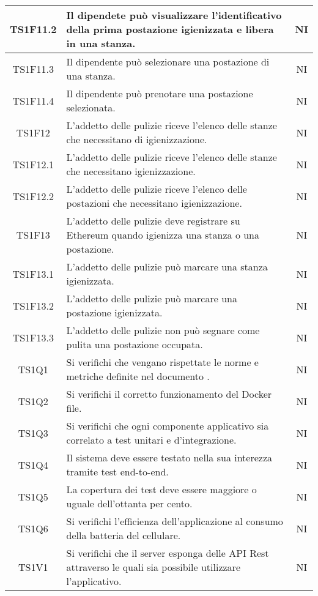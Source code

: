 \begin{center}
\begin{longtable}{|c|p{10cm}|c|}
			\hline
			TS1F11.2 & Il dipendete può visualizzare l'identificativo della prima postazione igienizzata e libera in una stanza. & NI \\	
			\hline
			TS1F11.3 & Il dipendente può selezionare una postazione di una stanza. & NI \\	
			\hline
			TS1F11.4 & Il dipendente può prenotare una postazione selezionata. & NI \\	
			\hline
			TS1F12 & L'addetto delle pulizie riceve l'elenco delle stanze che necessitano di igienizzazione. & NI \\	
			\hline
			TS1F12.1 & L'addetto delle pulizie riceve l'elenco delle stanze che necessitano igienizzazione. & NI \\	
			\hline
			TS1F12.2 & L'addetto delle pulizie riceve l'elenco delle postazioni che necessitano igienizzazione. & NI \\	
			\hline
			TS1F13 & L'addetto delle pulizie deve registrare su Ethereum quando igienizza una stanza o una postazione. & NI \\	
			\hline
			TS1F13.1 & L'addetto delle pulizie può marcare una stanza igienizzata. & NI \\	
			\hline
			TS1F13.2 & L'addetto delle pulizie può marcare una postazione igienizzata. & NI \\	
			\hline
			TS1F13.3 & L'addetto delle pulizie non può segnare come pulita una postazione occupata. & NI \\	
			\hline
			TS1Q1 & Si verifichi che vengano rispettate le norme e metriche definite nel documento \dext{Piano di Qualifica v. 1.0.0}. & NI \\	
			\hline			
			TS1Q2 & Si verifichi il corretto funzionamento del Docker file. & NI \\	
			\hline	
			TS1Q3 & Si verifichi che ogni componente applicativo sia correlato a test unitari e d'integrazione. & NI \\	
			\hline
			TS1Q4 & Il sistema deve essere testato nella sua interezza tramite test end-to-end. & NI \\	
			\hline
			TS1Q5 & La copertura dei test deve essere maggiore o uguale dell'ottanta per cento. & NI \\	
			\hline
			TS1Q6 & Si verifichi l'efficienza dell'applicazione al consumo della batteria del cellulare. & NI \\	
			\hline
			TS1V1 & Si verifichi che il server esponga delle API Rest attraverso le quali sia possibile utilizzare l'applicativo. & NI \\	

\end{longtable}
\end{center}
